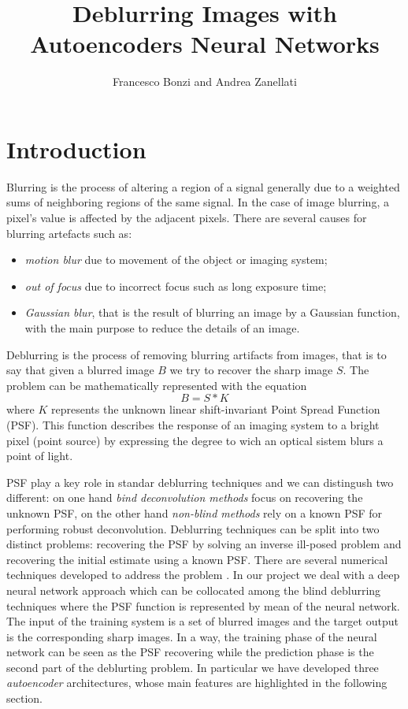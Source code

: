 \documentclass[12pt,a4paper]{article}
\title{Deblurring Images with Autoencoders Neural Networks}
\author{Francesco Bonzi and Andrea Zanellati}
\date{}
\begin{document}
\maketitle

\section*{Introduction}
Blurring is the process of altering a region of a signal generally due to  a weighted sums of neighboring regions of the same signal. In the case of image blurring, a pixel’s value is affected by the adjacent pixels. There are several causes for blurring artefacts such as\cite {P&V&G}: 
\begin{itemize}
\item \textit{motion blur} due to movement of the object or imaging system;
\item \textit{out of focus} due to incorrect focus such as long exposure time;
\item \textit{Gaussian blur}, that is the result of blurring an image by a Gaussian function, with the main purpose to reduce the details of an image.
\end{itemize}

Deblurring is the process of removing blurring artifacts from images, that is to say that given a blurred image $B$ we try to recover the sharp image $S$. The problem can be mathematically represented with the equation \begin{equation} B = S * K \end{equation} where $K$ represents the unknown linear shift-invariant Point Spread Function (PSF). This function describes the response of an imaging system to a bright pixel (point source) by expressing the degree to wich an optical sistem blurs a point of light.

PSF play a key role in standar deblurring techniques and we can distingush two different: on one hand \textit{bind deconvolution methods} focus on recovering the unknown PSF, on the other hand \textit{non-blind methods} rely on a known PSF for performing robust deconvolution. Deblurring techniques can be split into two distinct problems: recovering the PSF by solving an inverse ill-posed problem and recovering the initial estimate using a known PSF. There are several numerical techniques developed to address the problem \cite{H&Al}. In our project we deal with a deep neural network approach which can be collocated among the blind deblurring techniques where the PSF function is represented by mean of the neural network. The input of the training system is a set of blurred images and the target output is the corresponding sharp images. In a way, the training phase of the neural network can be seen as the  PSF recovering while the prediction phase is the second part of the deblurting problem. In particular we have developed three \textit{autoencoder} architectures, whose main features are highlighted in the following section. 
\end{document}
